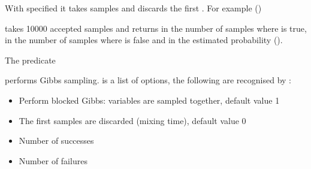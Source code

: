 \documentclass[letterpaper,10pt,english]{sphinxmanual}
\begin{document}
\sphinxAtStartPar
With  specified it takes  samples and discards the first .
For example ()

\begin{sphinxVerbatim}[commandchars=\\\{\}]
 \PYG{p}{[} \PYG{p}{]}
\end{sphinxVerbatim}

\sphinxAtStartPar
takes 10000 accepted samples and returns in  the number of samples where  is true,
in  the number of samples where  is false and in  the estimated probability ().

\sphinxAtStartPar
The predicate

\begin{sphinxVerbatim}[commandchars=\\\{\}]
  
\end{sphinxVerbatim}

\sphinxAtStartPar
performs Gibbs sampling.  is a list of options, the following are recognised by :
\begin{itemize}
\item {} 
\sphinxAtStartPar
{} Perform blocked Gibbs:  variables are sampled together, default value 1

\item {} 
\sphinxAtStartPar
{} The first  samples are discarded (mixing time), default value 0

\item {} 
\sphinxAtStartPar
{} Number of successes

\item {} 
\sphinxAtStartPar
{} Number of failures

\end{itemize}
\end{document}
